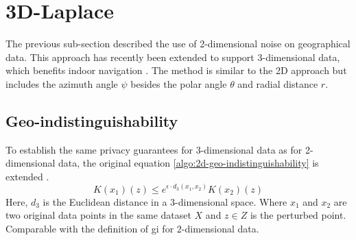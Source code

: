 \section{3D-Laplace}
The previous sub-section described the use of 2-dimensional noise on geographical data.
This approach has recently been extended to support 3-dimensional data, which benefits indoor navigation \citep{9646489}.
The method is similar to the 2D approach but includes the azimuth angle $\psi$ besides the polar angle $\theta$ and radial distance $r$.

\subsection{Geo-indistinguishability}
To establish the same privacy guarantees for 3-dimensional data as for 2-dimensional data, the original equation \ref{algo:2d-geo-indistinguishability} is extended \citep{9646489}.
\begin{equation}
  K(x_1)(z) \le e^{\epsilon \cdot d_3(x_1, x_2)} K(x_2)(z)
  \label{algo:3d-geo-indistinguishability}
\end{equation}
 Here, $d_3$ is the Euclidean distance in a 3-dimensional space. Where $x_1$ and $x_2$ are two original data points in the same dataset $X$ and $z \in Z$ is the perturbed point. Comparable with the definition of \gls{gi} for 2-dimensional data. 
